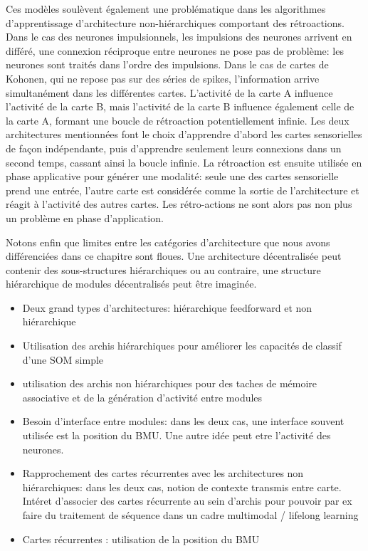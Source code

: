 \documentclass[../main]{subfiles}
\begin{document}
Ces modèles soulèvent également une problématique dans les algorithmes d'apprentissage d'architecture non-hiérarchiques comportant des rétroactions. Dans le cas des neurones impulsionnels, les impulsions des neurones arrivent en différé, une connexion réciproque entre neurones ne pose pas de problème: les neurones sont traités dans l'ordre des impulsions. Dans le cas de cartes de Kohonen, qui ne repose pas sur des séries de spikes, l'information arrive simultanément dans les différentes cartes. L'activité de la carte A influence l'activité de la carte B, mais l'activité de la carte B influence également celle de la carte A, formant une boucle de rétroaction potentiellement infinie. Les deux architectures mentionnées font le choix d'apprendre d'abord les cartes sensorielles de façon indépendante, puis d'apprendre seulement leurs connexions dans un second temps, cassant ainsi la boucle infinie. 
La rétroaction est ensuite utilisée en phase applicative pour générer une modalité: seule une des cartes sensorielle prend une entrée, l'autre carte est considérée comme la sortie de l'architecture et réagit à l'activité des autres cartes. Les rétro-actions ne sont alors pas non plus un problème en phase d'application.

Notons enfin que limites entre les catégories d'architecture que nous avons différenciées dans ce chapitre sont floues. Une architecture décentralisée peut contenir des sous-structures hiérarchiques ou au contraire, une structure hiérarchique de modules décentralisés peut être imaginée.


\begin{itemize}
    \item Deux grand types d'architectures: hiérarchique feedforward et non hiérarchique
    \item Utilisation des archis hiérarchiques pour améliorer les capacités de classif d'une SOM simple
    \item utilisation des archis non hiérarchiques pour des taches de mémoire associative et de la génération d'activité entre modules
    \item Besoin d'interface entre modules: dans les deux cas, une interface souvent utilisée est la position du BMU. Une autre idée peut etre l'activité des neurones.
    \item Rapprochement des cartes récurrentes avec les architectures non hiérarchiques: dans les deux cas, notion de contexte transmis entre carte. Intéret d'associer des cartes récurrente au sein d'archis pour pouvoir par ex faire du traitement de séquence dans un cadre multimodal / lifelong learning
    \item Cartes récurrentes : utilisation de la position du BMU
\end{itemize}
\end{document}
